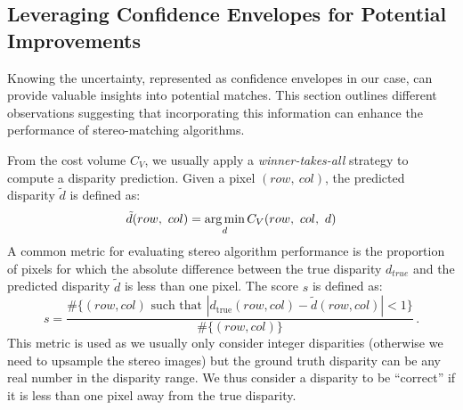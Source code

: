 \subsection{Leveraging Confidence Envelopes for Potential Improvements}\label{sec:sad_improvements}

Knowing the uncertainty, represented as confidence envelopes in our case, can provide valuable insights into potential matches. This section outlines different observations suggesting that incorporating this information can enhance the performance of stereo-matching algorithms.

From the cost volume $C_V$, we usually apply a \textit{winner-takes-all} strategy to compute a disparity prediction. Given a pixel $(row, ~col)$, the predicted disparity $\tilde{d}$ is defined as:
\begin{align}\label{eq:winner_takes_all}
    \tilde{d}(row, ~col) = \operatorname*{arg\,min}_{d}C_V(row, ~col, ~d)
\end{align}
A common metric for evaluating stereo algorithm performance is the proportion of pixels for which the absolute difference between the true disparity $d_{true}$ and the predicted disparity $\tilde{d}$ is less than one pixel. The score \( s \) is defined as:
\begin{equation}\label{eq:score_d1}
    s = \frac{\#\{(row, col) \text{ such that } |d_{\mathrm{true}}(row, col) - \tilde{d}(row, col)| < 1\}}{\#\{(row, col)\}}\,.
\end{equation}
This metric is used as we usually only consider integer disparities (otherwise we need to upsample the stereo images) but the ground truth disparity can be any real number in the disparity range. We thus consider a disparity to be ``correct'' if it is less than one pixel away from the true disparity.

